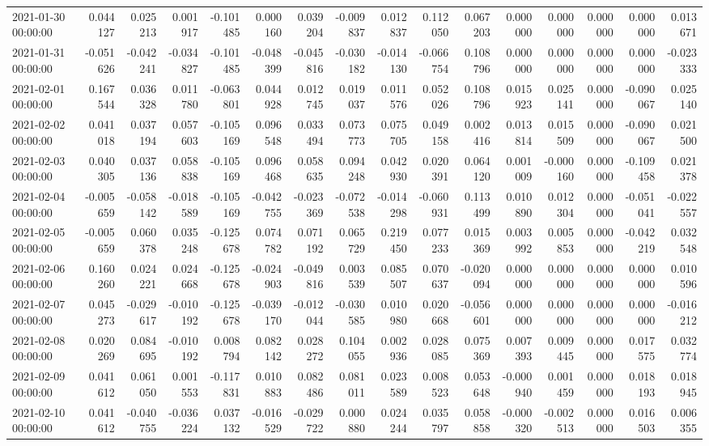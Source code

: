 \begin{tabular}{lrrrrrrrrrrrrrrr}
2021-01-30 00:00:00 & 0.044127 & 0.025213 & 0.001917 & -0.101485 & 0.000160 & 0.039204 & -0.009837 & 0.012837 & 0.112050 & 0.067203 & 0.000000 & 0.000000 & 0.000000 & 0.000000 & 0.013671 \\
2021-01-31 00:00:00 & -0.051626 & -0.042241 & -0.034827 & -0.101485 & -0.048399 & -0.045816 & -0.030182 & -0.014130 & -0.066754 & 0.108796 & 0.000000 & 0.000000 & 0.000000 & 0.000000 & -0.023333 \\
2021-02-01 00:00:00 & 0.167544 & 0.036328 & 0.011780 & -0.063801 & 0.044928 & 0.012745 & 0.019037 & 0.011576 & 0.052026 & 0.108796 & 0.015923 & 0.025141 & 0.000000 & -0.090067 & 0.025140 \\
2021-02-02 00:00:00 & 0.041018 & 0.037194 & 0.057603 & -0.105169 & 0.096548 & 0.033494 & 0.073773 & 0.075705 & 0.049158 & 0.002416 & 0.013814 & 0.015509 & 0.000000 & -0.090067 & 0.021500 \\
2021-02-03 00:00:00 & 0.040305 & 0.037136 & 0.058838 & -0.105169 & 0.096468 & 0.058635 & 0.094248 & 0.042930 & 0.020391 & 0.064120 & 0.001009 & -0.000160 & 0.000000 & -0.109458 & 0.021378 \\
2021-02-04 00:00:00 & -0.005659 & -0.058142 & -0.018589 & -0.105169 & -0.042755 & -0.023369 & -0.072538 & -0.014298 & -0.060931 & 0.113499 & 0.010890 & 0.012304 & 0.000000 & -0.051041 & -0.022557 \\
2021-02-05 00:00:00 & -0.005659 & 0.060378 & 0.035248 & -0.125678 & 0.074782 & 0.071192 & 0.065729 & 0.219450 & 0.077233 & 0.015369 & 0.003992 & 0.005853 & 0.000000 & -0.042219 & 0.032548 \\
2021-02-06 00:00:00 & 0.160260 & 0.024221 & 0.024668 & -0.125678 & -0.024903 & -0.049816 & 0.003539 & 0.085507 & 0.070637 & -0.020094 & 0.000000 & 0.000000 & 0.000000 & 0.000000 & 0.010596 \\
2021-02-07 00:00:00 & 0.045273 & -0.029617 & -0.010192 & -0.125678 & -0.039170 & -0.012044 & -0.030585 & 0.010980 & 0.020668 & -0.056601 & 0.000000 & 0.000000 & 0.000000 & 0.000000 & -0.016212 \\
2021-02-08 00:00:00 & 0.020269 & 0.084695 & -0.010192 & 0.008794 & 0.082142 & 0.028272 & 0.104055 & 0.002936 & 0.028085 & 0.075369 & 0.007393 & 0.009445 & 0.000000 & 0.017575 & 0.032774 \\
2021-02-09 00:00:00 & 0.041612 & 0.061050 & 0.001553 & -0.117831 & 0.010883 & 0.082486 & 0.081011 & 0.023589 & 0.008523 & 0.053648 & -0.000940 & 0.001459 & 0.000000 & 0.018193 & 0.018945 \\
2021-02-10 00:00:00 & 0.041612 & -0.040755 & -0.036224 & 0.037132 & -0.016529 & -0.029722 & 0.000880 & 0.024244 & 0.035797 & 0.058858 & -0.000320 & -0.002513 & 0.000000 & 0.016503 & 0.006355 \\

\end{tabular}

